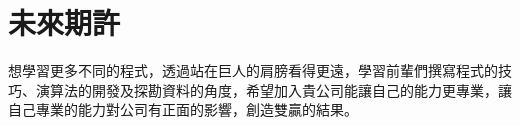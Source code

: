 \documentclass[paper=a4, fontsize=12pt]{scrartcl} %
\numberwithin{equation}{section} %
\numberwithin{figure}{section} %
\numberwithin{table}{section} %
\begin{document}
\section*{未來期許}
\quad\quad
想學習更多不同的程式，透過站在巨人的肩膀看得更遠，學習前輩們撰寫程式的技巧、演算法的開發及探勘資料的角度，希望加入貴公司能讓自己的能力更專業，讓自己專業的能力對公司有正面的影響，創造雙贏的結果。
\begin{comment}  %
\begin{align} 
\begin{split}
(x+y)^3 	&= (x+y)^2(x+y)\\
&=(x^2+2xy+y^2)(x+y)\\
&=(x^3+2x^2y+xy^2) + (x^2y+2xy^2+y^3)\\
&=x^3+3x^2y+3xy^2+y^3
\end{split}					
\end{align}

Phasellus viverra nulla ut metus varius laoreet. Quisque rutrum. Aenean imperdiet. Etiam ultricies nisi vel augue. Curabitur ullamcorper ultricies


\subsection{Heading on level 2 (subsection)}

Lorem ipsum dolor sit amet, consectetuer adipiscing elit. 
\begin{align}
A = 
\begin{bmatrix}
A_{11} & A_{21} \\
A_{21} & A_{22}
\end{bmatrix}
\end{align}
Aenean commodo ligula eget dolor. Aenean massa. Cum sociis natoque penatibus et magnis dis parturient montes, nascetur ridiculus mus. Donec quam felis, ultricies nec, pellentesque eu, pretium quis, sem.


\subsubsection{Heading on level 3 (subsubsection)}

\lipsum[3] %

\paragraph{Heading on level 4 (paragraph)}


\end{comment}
\end{document}
